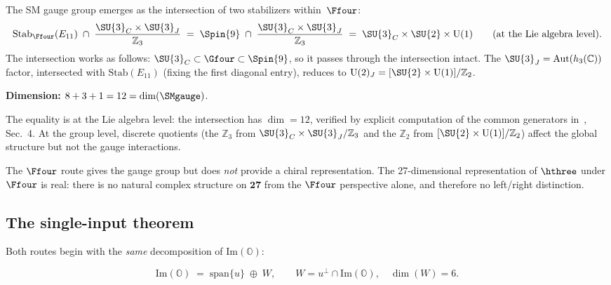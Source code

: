 The SM gauge group emerges as the intersection of two stabilizers
within~$\Ffour$:
\begin{equation}\label{eq:F4-intersection}
  \mathrm{Stab}_{\Ffour}(E_{11}) \;\cap\;
  \frac{\SU{3}_C\times\SU{3}_J}{\mathbb{Z}_3}
  \;=\;
  \Spin{9} \;\cap\;
  \frac{\SU{3}_C\times\SU{3}_J}{\mathbb{Z}_3}
  \;=\;
  \SU{3}_C \times \SU{2} \times \mathrm{U}(1)
  \qquad
  \text{(at the Lie algebra level).}
\end{equation}
The intersection works as follows: $\SU{3}_C\subset\Gfour\subset\Spin{9}$,
so it passes through the intersection intact.  The
$\SU{3}_J = \mathrm{Aut}(h_3(\mathbb{C}))$ factor,
intersected with $\mathrm{Stab}(E_{11})$ (fixing the first diagonal entry),
reduces to $\mathrm{U}(2)_J = [\SU{2}\times\mathrm{U}(1)]/\mathbb{Z}_2$.

\noindent\textbf{Dimension:}
$8 + 3 + 1 = 12 = \dim(\SMgauge)$.\ \checkmark

\noindent The equality is at the Lie algebra level:
the intersection has $\dim = 12$, verified by explicit computation of
the common generators in~\cite{TodorovDrenska2018}, Sec.~4.  At the
group level, discrete quotients (the $\mathbb{Z}_3$ from
$\SU{3}_C\times\SU{3}_J/\mathbb{Z}_3$ and the $\mathbb{Z}_2$ from
$[\SU{2}\times\mathrm{U}(1)]/\mathbb{Z}_2$) affect the global
structure but not the gauge interactions.

\begin{remark}
The $\Ffour$ route gives the gauge group but does \emph{not}
provide a chiral representation.  The 27-dimensional representation
of $\hthree$ under $\Ffour$ is real: there is no natural complex
structure on $\mathbf{27}$ from the $\Ffour$ perspective alone,
and therefore no left/right distinction.
\end{remark}

\subsection{The single-input theorem}\label{sec:single-input}

Both routes begin with the \emph{same} decomposition of
$\mathrm{Im}(\mathbb{O})$:

\begin{equation}\label{eq:common-split}
  \mathrm{Im}(\mathbb{O})
  \;=\;
  \mathrm{span}\{u\} \;\oplus\; W,
  \qquad
  W = u^\perp\cap\mathrm{Im}(\mathbb{O}),
  \quad \dim(W) = 6.
\end{equation}


